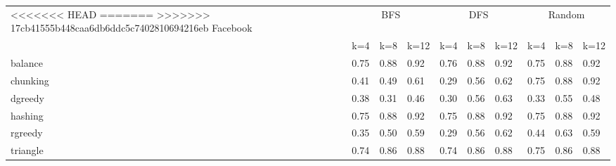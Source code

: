 \documentclass[12pt]{article}
\begin{document}
\begin{tabular}{llllllllll}
<<<<<<< HEAD
\toprule
=======
\toprule 
>>>>>>> 17cb41555b448caa6db6ddc5c7402810694216eb
    Facebook & \multicolumn{3}{c}{BFS} & \multicolumn{3}{c}{DFS} & \multicolumn{3}{c}{Random}\\

    & k=4 & k=8 & k=12
    & k=4 & k=8 & k=12
     & k=4 & k=8 & k=12  \\
    \midrule
    balance &  0.75 & 0.88 	& 0.92 	& 0.76 	 &0.88 	& 0.92 	 &0.75 	& 0.88 	& 0.92       \\
chunking&	  0.41 	& 0.49 &	 0.61 &	 0.29 &	 0.56 &	 0.62 &	 0.75 &	 0.88 &	 0.92 \\
dgreedy&	  0.38 	& 0.31 &	 0.46 &	 0.30 &	 0.56 &	 0.63 &	 0.33 &	 0.55 &	 0.48  \\
hashing&	    0.75 	& 0.88 &	 0.92 &	 0.75 &	 0.88 &	 0.92 &	 0.75 &	 0.88 &	 0.92 \\
rgreedy&	    0.35 	& 0.50 &	 0.59 &	 0.29 &	 0.56 &	 0.62 &	 0.44 &	 0.63 &	 0.59 \\
triangle&	    0.74 	& 0.86 &	 0.88 &	 0.74 &	 0.86 &	 0.88 &	 0.75 &	 0.86 &	 0.88  \\
    \bottomrule
\end{tabular}
\end{document}
